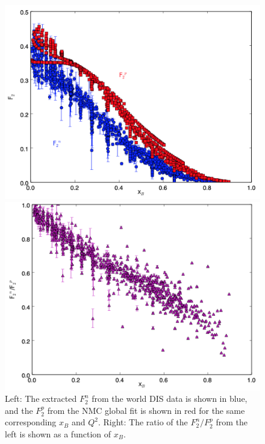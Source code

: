 \documentclass[oneside]{article}
\begin{document}
 \begin{figure}
\begin{minipage}{0.5\textwidth}
 \includegraphics[width=\textwidth]{plots/f2np_plot.png}
\end{minipage}\hfill\begin{minipage}{0.5\textwidth}
 \includegraphics[width=\textwidth]{plots/f2npratio_plot.png}
 \end{minipage}
  \caption[$F_2^{n,p}$ characteristics]{Left: The extracted $F_2^n$ from the world DIS data is shown in blue, and the $F_2^p$ from the NMC global fit is shown in red for the same corresponding $x_B$ and $Q^2$. Right: The ratio of the $F_2^n/F_2^p$ from the left is shown as a function of $x_B$.}
  \label{fig:F2np_general}
\end{figure} 
 
\end{document}
